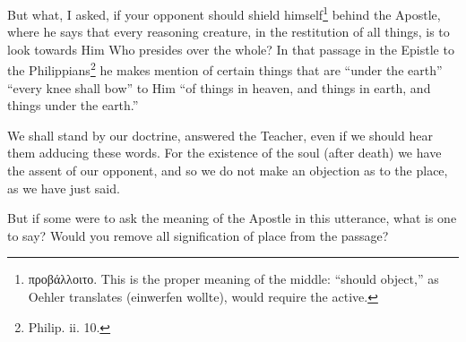 But what, I asked, if your opponent should shield himself\footnote{\textgreek{προβάλλοιτο}. This is the proper meaning of the middle: “should object,” as Oehler translates (einwerfen wollte), would require the active.} behind the Apostle, where he says that every reasoning creature, in the restitution of all things, is to look towards Him Who presides over the whole? In that passage in the Epistle to the Philippians\footnote{Philip. ii. 10.} he makes mention of certain things that are “under the earth” “every knee shall bow” to Him “of things in heaven, and things in earth, and things under the earth.”

We shall stand by our doctrine, answered the Teacher, even if we should hear them adducing these words. For the existence of the soul (after death) we have the assent of our opponent, and so we do not make an objection as to the place, as we have just said.

But if some were to ask the meaning of the Apostle in this utterance, what is one to say? Would you remove all signification of place from the passage?


